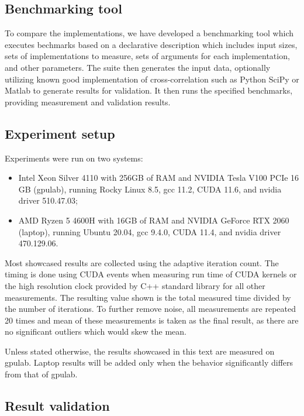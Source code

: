 \subsection{Benchmarking tool}

To compare the implementations, we have developed a benchmarking tool which executes bechmarks based on a declarative description which includes input sizes, sets of implementations to measure, sets of arguments for each implementation, and other parameters. The suite then generates the input data, optionally utilizing known good implementation of cross-correlation such as Python SciPy or Matlab to generate results for validation. It then runs the specified benchmarks, providing measurement and validation results.

\subsection{Experiment setup}

Experiments were run on two systems:
\begin{itemize}
	\item Intel Xeon Silver 4110 with 256GB of RAM and NVIDIA Tesla V100 PCIe 16 GB (gpulab), running Rocky Linux 8.5, gcc 11.2, CUDA 11.6, and nvidia driver 510.47.03;
	\item AMD Ryzen 5 4600H with 16GB of RAM and NVIDIA GeForce RTX 2060 (laptop), running Ubuntu 20.04, gcc 9.4.0, CUDA 11.4, and nvidia driver 470.129.06.
\end{itemize}

Most showcased results are collected using the adaptive iteration count. The timing is done using CUDA events when measuring run time of CUDA kernels or the high resolution clock provided by C++ standard library for all other measurements.  The resulting value shown is the total measured time divided by the number of iterations. To further remove noise, all measurements are repeated 20 times and mean of these measurements is taken as the final result, as there are no significant outliers which would skew the mean.

Unless stated otherwise, the results showcased in this text are measured on gpulab. Laptop results will be added only when the behavior significantly differs from that of gpulab.

\subsection{Result validation}



